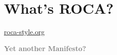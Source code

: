 \documentclass{beamer}
\begin{document}
\section{What's ROCA?}

{
  \begin{frame}
    \vspace*{-6.4cm}
    \href{http://roca-style.org}{roca-style.org}

  \end{frame}
}

\begin{frame}
  \vspace*{-1cm}
  \textcolor{gray}{
    \begin{center}
      \textbf{
        \fontsize{60}{60}\selectfont Yet another Manifesto?
      }
    \end{center}
  }

\end{frame}
\end{document}
